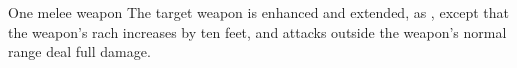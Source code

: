 \begin{spellheader}
    \spelldur{\durshort}
\end{spellheader}
\begin{spelleffects}
    \begin{spelltarget}{One melee weapon}
        \spelleffect The target weapon is enhanced and extended, as , except that the weapon's rach increases by ten feet, and attacks outside the weapon's normal range deal full damage.
    \end{spelltarget}
\end{spelleffects}
\begin{spellfooter}
\end{spellfooter}
